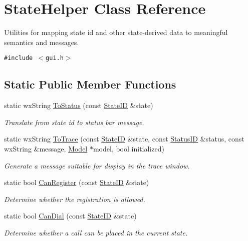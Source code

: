 \hypertarget{classStateHelper}{
\section{StateHelper Class Reference}
\label{classStateHelper}
}
Utilities for mapping state id and other state-derived data to meaningful semantics and messages.  


{\tt \#include $<$gui.h$>$}

\subsection*{Static Public Member Functions}
\begin{CompactItemize}
\item 
static wxString \hyperlink{classStateHelper_b33007a2d3887bbaff4acce948301579}{ToStatus} (const \hyperlink{state_8h_2c309f64131cbfdae6d95e6591f208e6}{StateID} \&state)
\begin{CompactList}\small\item\em Translate from state id to status bar message. \item\end{CompactList}\item 
static wxString \hyperlink{classStateHelper_c1c01103481e034cdcd4c679cf3bb45e}{ToTrace} (const \hyperlink{state_8h_2c309f64131cbfdae6d95e6591f208e6}{StateID} \&state, const \hyperlink{state_8h_26688ca6a181d6c6cf4f21d9839d4125}{StatusID} \&status, const wxString \&message, \hyperlink{classModel}{Model} $\ast$model, bool initialized)
\begin{CompactList}\small\item\em Generate a message suitable for display in the trace window. \item\end{CompactList}\item 
static bool \hyperlink{classStateHelper_2b3caf1bdd542b47e46dfbfedccead7f}{CanRegister} (const \hyperlink{state_8h_2c309f64131cbfdae6d95e6591f208e6}{StateID} \&state)
\begin{CompactList}\small\item\em Determine whether the registration is allowed. \item\end{CompactList}\item 
static bool \hyperlink{classStateHelper_dd3c36b37666dde08e682f49d999b510}{CanDial} (const \hyperlink{state_8h_2c309f64131cbfdae6d95e6591f208e6}{StateID} \&state)
\begin{CompactList}\small\item\em Determine whether a call can be placed in the current state. \item\end{CompactList}\item 

\end{CompactItemize}
